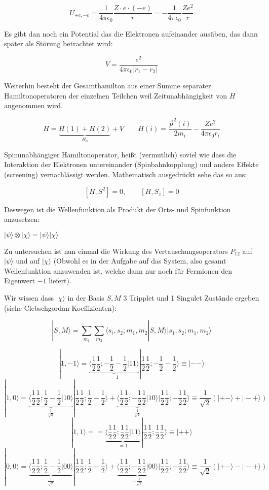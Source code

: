 \[ U_{+e,-e} =\frac{1}{4\pi\epsilon_0}\frac{Z\cdot e \cdot (-e)}{r} = - \frac{1}{4\pi\epsilon_0}\frac{Ze^2}{r}\]

Es gibt dan noch ein Potential das die Elektronen aufeinander ausüben, das dann später als Störung betrachtet wird:

\[V = \frac{ e^2}{4\pi\epsilon_0 |r_1-r_2|} \]



Weiterhin besteht der Gesamthamilton aus einer Summe separater Hamiltonoperatoren der einzelnen Teilchen weil Zeitunabhängigkeit von \(H\) angenommen wird. 


\[H = \underbrace{H(1)+H(2)}_{H_0} + V\qquad H(i)= \frac{\vec p^2(i)}{2m_i} - \frac{Z e^2}{4\pi\epsilon_0r_i} \]


Spinunabhängiger Hamiltonoperator, heißt (vermutlich) soviel wie dass die Interaktion der Elektronen untereinander (Spinbahnkopplung) und andere Effekte (screening) vernachlässigt werden. Mathematisch ausgedrückt sehe das so aus:

\[[H,S^2]=0,\qquad [H,S_z]=0\]

Deswegen ist die Wellenfunktion als Produkt der Orts- und Spinfunktion anzusetzen:

\(|\psi\rangle \otimes |\chi\rangle  = |\psi\rangle|\chi\rangle  \)

Zu untersuchen ist nun einmal die Wirkung des Vertauschungsoperators \(P_{12}\) auf \(|\psi\rangle \) und auf \(|\chi \rangle \) (Obwohl es in der Aufgabe auf das System, also gesamt Wellenfunktion anzuwenden ist, welche dann nur noch für Fermionen den Eigenwert \(-1\) liefert).

Wir wissen dass \(|\chi\rangle \) in der Basis \(S,M\) 3 Tripplet und 1 Singulet Zustände ergeben (siehe Clebschgordan-Koeffizienten):

\[|S,M\rangle = \sum_{m_1}\sum_{m_2}\langle s_i,s_2;m_1,m_2|S,M\rangle |s_1,s_2;m_1,m_2\rangle \]

\[|1,-1\rangle =\underbrace{ \langle \frac{1}{2}\frac{1}{2};-\frac{1}{2}-\frac{1}{2}|11\rangle }_{=1}  | \frac{1}{2}\frac{1}{2};  -\frac{1}{2} -\frac{1}{2} \rangle   \equiv |--\rangle   \]
\[|1,0\rangle =  \underbrace{\langle \frac{1}{2}   \frac{1}{2}; \frac{1}{2} - \frac{1}{2}|10\rangle  }_{\frac{1}{\sqrt{2}}}|\frac{1}{2}   \frac{1}{2}; \frac{1}{2} - \frac{1}{2}\rangle  +  \underbrace{\langle \frac{1}{2}   \frac{1}{2}; -\frac{1}{2} \frac{1}{2}|10\rangle  }_{\frac{1}{\sqrt{2}}} |\frac{1}{2}   \frac{1}{2}; -\frac{1}{2} \frac{1}{2} \rangle \equiv  \frac{1}{\sqrt{2}} (|+-\rangle +  |-+\rangle )   \]
\[|1,1\rangle = =\underbrace{ \langle \frac{1}{2}\frac{1}{2};\frac{1}{2}\frac{1}{2}|11\rangle }_{=1}  | \frac{1}{2}\frac{1}{2};  \frac{1}{2} \frac{1}{2} \rangle   \equiv |++\rangle   \]
\[|0,0\rangle = \underbrace{\langle \frac{1}{2}   \frac{1}{2}; \frac{1}{2} - \frac{1}{2}|00\rangle  }_{\frac{1}{\sqrt{2}}}|\frac{1}{2}   \frac{1}{2}; \frac{1}{2} - \frac{1}{2}\rangle  +  \underbrace{\langle \frac{1}{2}   \frac{1}{2}; -\frac{1}{2} \frac{1}{2}|00\rangle  }_{-\frac{1}{\sqrt{2}}} |\frac{1}{2}   \frac{1}{2}; -\frac{1}{2} \frac{1}{2} \rangle \equiv  \frac{1}{\sqrt{2}} (|+-\rangle -  |-+\rangle ) \]

